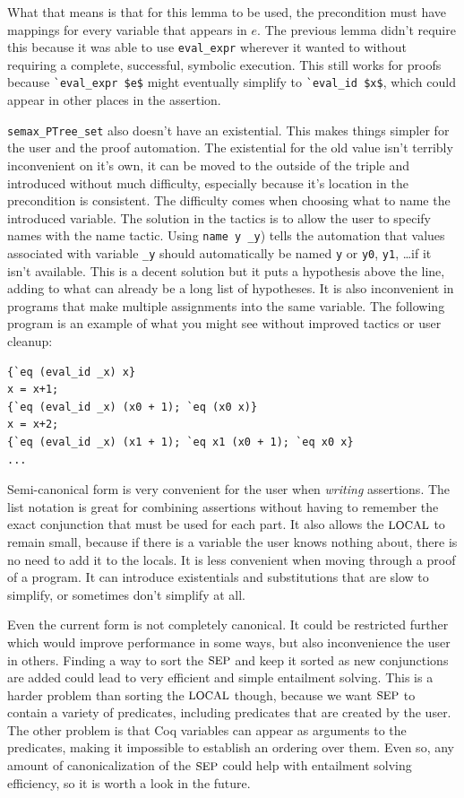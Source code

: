 \documentclass{puthesis}
\begin{document}
What that means is that for this lemma to be used, the precondition
must have mappings for every variable that appears in $e$. The
previous lemma didn't require this because it was able to use
\lstinline|eval_expr| wherever it wanted to without requiring a
complete, successful, symbolic execution. This still works for proofs
because \lstinline|`eval_expr $e$| might eventually simplify to
\lstinline|`eval_id $x$|, which could appear in other places in the
assertion.

\lstinline|semax_PTree_set| also doesn't have an existential. This
makes things simpler for the user and the proof automation. The
existential for the old value isn't terribly inconvenient on it's own,
it can be moved to the outside of the triple and introduced without
much difficulty, especially because it's location in the precondition
is consistent. The difficulty comes when choosing what to name the
introduced variable. The solution in the tactics is to allow the user
to specify names with the name tactic. Using \lstinline|name y _y|)
tells the automation that values associated with variable
\lstinline|_y| should automatically be named \lstinline|y| or
\lstinline|y0|, \lstinline|y1|, \ldots if it isn't available.  This is
a decent solution but it puts a hypothesis above the line, adding to
what can already be a long list of hypotheses. It is also inconvenient
in programs that make multiple assignments into the same variable. The
following program is an example of what you might see without improved
tactics or user cleanup:

\begin{verbatim}
{`eq (eval_id _x) x}
x = x+1;
{`eq (eval_id _x) (x0 + 1); `eq (x0 x)}
x = x+2;
{`eq (eval_id _x) (x1 + 1); `eq x1 (x0 + 1); `eq x0 x}
...
\end{verbatim}



Semi-canonical form is very convenient for the user when
\emph{writing} assertions. The list notation is great for combining
assertions without having to remember the exact conjunction that must
be used for each part. It also allows the $\mbox{\small LOCAL}$ to remain small,
because if there is a variable the user knows nothing about, there is
no need to add it to the locals. It is less convenient when moving
through a proof of a program. It can introduce existentials and
substitutions that are slow to simplify, or sometimes don't simplify
at all.

Even the current form is not completely canonical. It could be
restricted further which would improve performance in some ways, but
also inconvenience the user in others. Finding a way to sort the
$\mbox{\small SEP}$ and keep it sorted as new conjunctions are added could lead to
very efficient and simple entailment solving. This is a harder problem
than sorting the $\mbox{\small LOCAL}$ though, because we want $\mbox{\small SEP}$ to contain a
variety of predicates, including predicates that are created by the
user. The other problem is that Coq variables can appear as arguments
to the predicates, making it impossible to establish an ordering over
them. Even so, any amount of canonicalization of the $\mbox{\small SEP}$ could help
with entailment solving efficiency, so it is worth a look in the
future.
\end{document}
